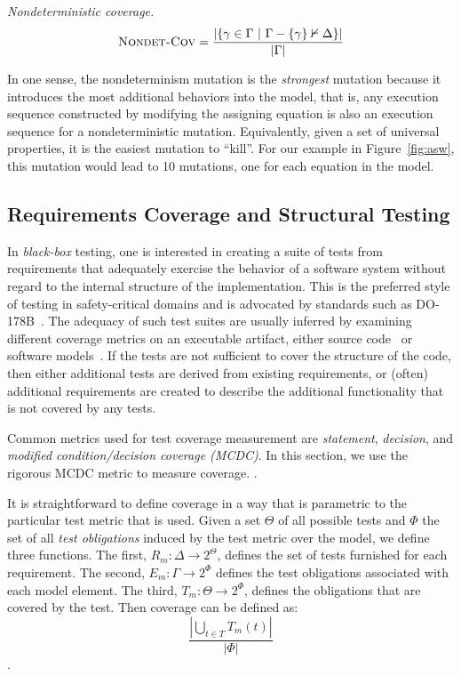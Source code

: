 \begin{definition} {\emph{Nondeterministic coverage.} }
\[
   \text{\sc Nondet-Cov} = \frac{ | \{\gamma \in \Gamma~|~ \Gamma - \{\gamma\} \nvdash \Delta\} |}{|\Gamma|}
\]
\end{definition}

\noindent In one sense, the nondeterminism mutation is the {\em strongest} mutation because it introduces the most additional behaviors into the model, that is, any execution sequence constructed by modifying the assigning equation is also an execution sequence for a nondeterministic mutation.  Equivalently, given a set of universal properties, it is the easiest mutation to ``kill''.  For our example in Figure~\ref{fig:asw}, this mutation would lead to 10 mutations, one for each equation in the model.


\iffalse
\subsection{Requirements Coverage and Structural Testing}
In {\em black-box} testing, one is interested in creating a suite of tests from requirements that adequately exercise the behavior
of a software system without regard to the internal structure of the implementation.  This is the preferred style of testing in
safety-critical domains and is advocated by standards such as DO-178B~\cite{RTCA:DO-178B}.  The adequacy of such test suites are usually inferred by examining different coverage metrics on an executable artifact, either source code~\cite{Bezier90:TestingBook,MCDCPaper} or software models~\cite{Ammann99:SpecBasedCoverageMetric,Sanjai03:dissertation}.  If the tests are not sufficient to cover the structure of the code, then either additional tests are derived from existing requirements, or (often) additional requirements are created to describe the additional functionality that is not covered by any tests.

Common metrics used for test coverage measurement are {\em statement}, {\em decision}, and {\em modified condition/decision coverage (MCDC)}.  In this section, we use the rigorous MCDC metric to measure coverage.  .

It is straightforward to define coverage in a way that is parametric to the particular test metric that is used.  Given a set $\Theta$ of all possible tests and $\Phi$ the set of all {\em test obligations} induced by the test metric over the model, we define three functions.  The first, $R_m : \Delta \rightarrow 2^\Theta$, defines the set of tests furnished for each requirement.  The second, $E_m : \Gamma \rightarrow 2^\Phi$ defines the test obligations associated with each model element.  The third, $T_m : \Theta \rightarrow 2^\Phi$, defines the obligations that are covered by the test.  Then coverage can be defined as: $$\frac{|\bigcup_{t \in T} T_m (t)|}{|\Phi|}$$.


